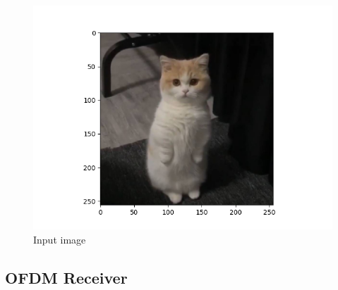 \begin{figure}[ht]
    \centering
    \includegraphics[width=\textwidth]{../Source/results/input.png}
    \caption{Input image}
    \label{input}
\end{figure}

\subsection{OFDM Receiver}

